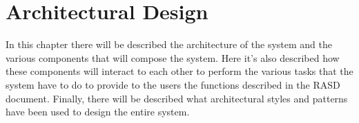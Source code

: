 \documentclass[../../dd.tex]{subfiles}
\begin{document}
	\chapter{Architectural Design}
		In this chapter there will be described the architecture of the system and the various components that will compose the system.
		Here it's also described how these components will interact to each other to perform the various tasks that the system have to do to provide to the users the functions described in the RASD document.
		Finally, there will be described what architectural styles and patterns have been used to design the entire system.

		

		

		

		

		

		

		

		
\end{document}
